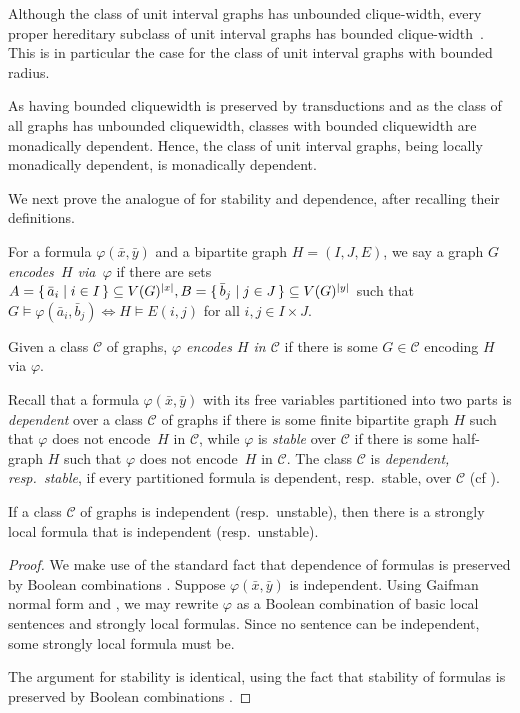 \documentclass{lmcs}
\newcommand{\Cc}{\mathscr{C}}
\renewcommand{\phi}{\varphi}
\theoremstyle{definition}
\begin{document}
\begin{exa}
Although the class of unit interval graphs has unbounded clique-width,
	every proper hereditary subclass of unit interval graphs
	has bounded clique-width~\cite[Theorem 3]{UIcw}. 
	This is in particular the case for the class of unit interval graphs with bounded radius. 
		
	As having bounded cliquewidth is preserved by transductions and as the class of all graphs has unbounded cliquewidth,  classes with bounded cliquewidth are monadically dependent.
	Hence, the class of unit interval graphs, being locally monadically dependent, is monadically dependent. 
\end{exa}

We next prove the analogue of  for stability and dependence, after recalling their definitions.


	For a formula $\phi(\bar{x},\bar{y})$ and a bipartite graph $H=(I,J,E)$, we say a graph $G$ {\em encodes~$H$ via~$\phi$} if
	there are sets $A=\set{\bar{a}_i | i \in I} \subseteq V(G)^{|x|}, B=\set{\bar{b}_j | j \in J} \subseteq V(G)^{|y|}$ such that 
	$G\models\phi(\bar{a}_i,\bar{b}_j)\Leftrightarrow H\models E(i,j)$ for all $i,j\in I\times J$.  
	
	Given a class $\Cc$ of graphs, {\em $\phi$ encodes $H$ in $\Cc$} if there is some $G \in \Cc$ encoding $H$ via $\phi$.
	

Recall that a formula $\phi(\bar{x}, \bar{y})$ with its free variables partitioned into two parts is {\em dependent} over a class $\Cc$ of graphs if there is some finite bipartite graph $H$ such that $\phi$ does not encode~$H$ in $\Cc$, while $\phi$ is {\em stable} over $\Cc$ if there is some half-graph $H$ such that $\phi$ does not encode~$H$ in $\Cc$. The class $\Cc$ is {\em dependent, resp.\ stable}, if every partitioned formula is dependent, resp.\ stable, over $\Cc$ (cf  ).

\begin{lem}
	If a class $\Cc$ of graphs is independent (resp.\ unstable), then there is a strongly local
	formula that is independent (resp.\ unstable). 
\end{lem}
\begin{proof}
	We make use of the standard fact that dependence of formulas is preserved by Boolean combinations \cite[Lemma 2.9]{simon2015guide}.
	 Suppose $\phi(\bar{x}, \bar{y})$ is independent. Using Gaifman normal form and , we may rewrite $\phi$ as a Boolean combination of basic local sentences and strongly local formulas. Since no sentence can be independent, some strongly local formula must be. 
	
	The argument for stability is identical,  using the fact that stability of formulas is preserved by Boolean combinations \cite[Remark 3.4]{palacin2018introduction}.
\end{proof}
\end{document}
